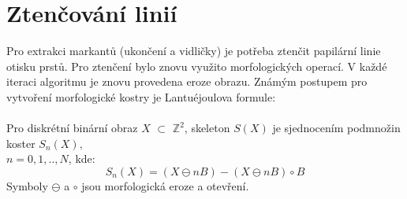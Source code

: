 \section{Ztenčování linií}
Pro extrakci markantů (ukončení a vidličky) je potřeba ztenčit papilární linie otisku prstů. Pro ztenčení bylo znovu využito morfologických operací. V každé iteraci algoritmu je znovu provedena eroze obrazu.
Známým postupem pro vytvoření morfologické kostry je Lantuéjoulova formule:\cite{WikipediaSkeleton}\\\\
Pro diskrétní binární obraz $X$ $\subset$ $\mathds{Z}^2$, skeleton $S(X)$ je sjednocením podmnožin koster ${S_n(X)},$\\$ n = 0,1,..,N$, kde:
$$S_n(X) = (X \ominus nB) - (X \ominus nB) \circ B$$ Symboly $\ominus$ a $\circ$ jsou morfologická eroze a otevření. 

